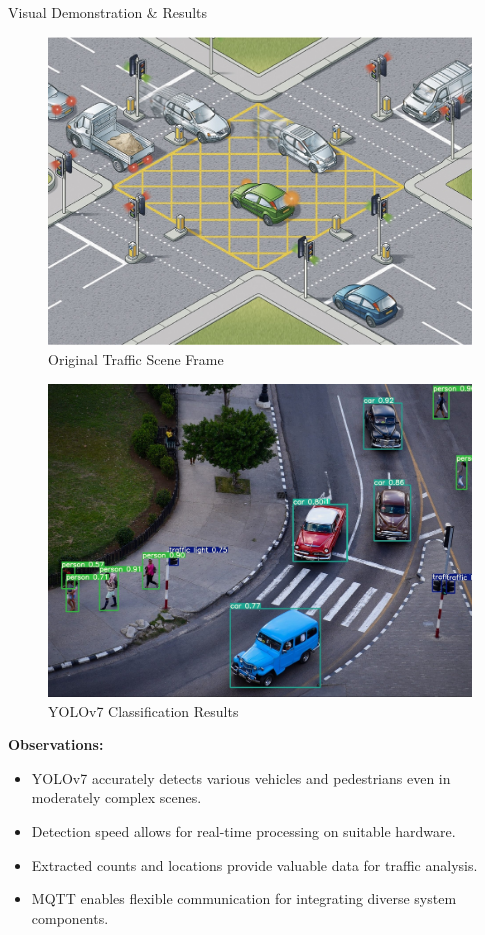 \documentclass[final]{beamer}
\newlength{\colwidth}
\begin{document}
\begin{frame}[t]
\begin{columns}[t]
\begin{column}{\colwidth}
\begin{block}{Visual Demonstration \& Results}
    \begin{figure}[h!]
      \centering
      \includegraphics[width=0.8\linewidth]{rule-174-enter-a-box-junction-only-if-your-exit-road-is-clear_orig.jpg}
      \caption{ Original Traffic Scene Frame}
      \label{fig:original-traffic}
    \end{figure}
    \begin{figure}[h!]
      \centering
      \includegraphics[width=0.8\linewidth]{jeremy-stewardson-yolov7-e1657792694411.jpg}
      \caption{ YOLOv7 Classification Results}
      \label{fig:yolo-classification}
    \end{figure}
  \textbf{Observations:}
    \begin{itemize}
      \item YOLOv7 accurately detects various vehicles and pedestrians even in moderately complex scenes.
      \item Detection speed allows for real-time processing on suitable hardware.
      \item Extracted counts and locations provide valuable data for traffic analysis.
      \item MQTT enables flexible communication for integrating diverse system components.
    \end{itemize}
  \end{block}


\end{column}
\end{columns}
\end{frame}
\end{document}
